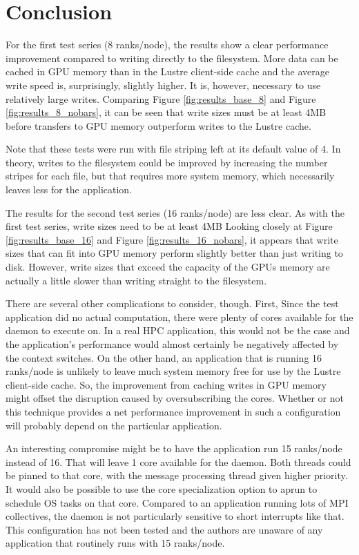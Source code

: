 \section{Conclusion}
\label{sec:conclusion}

For the first test series (8 ranks/node), the results show a clear performance improvement compared to writing directly to the filesystem.   More data can be cached in GPU memory than in the Lustre client-side cache and the average write speed is, surprisingly, slightly higher.  It is, however, necessary to use relatively large writes.   Comparing Figure \ref{fig:results_base_8} and Figure \ref{fig:results_8_nobars},  it can be seen that write sizes must be at least 4MB before transfers to GPU memory outperform writes to the Lustre cache.

Note that these tests were run with file striping left at its default value of 4.  In theory, writes to the filesystem could be improved by increasing the number stripes for each file, but that requires more system memory, which necessarily leaves less for the application.

The results for the second test series (16 ranks/node) are less clear.  As with the first test series, write sizes need to be at least 4MB Looking closely at Figure \ref{fig:results_base_16} and Figure \ref{fig:results_16_nobars}, it appears that write sizes that can fit into GPU memory perform slightly better than just writing to disk.  However, write sizes that exceed the capacity of the GPUs memory are actually a little slower than writing straight to the filesystem.

There are several other complications to consider, though.
First, Since the test application did no actual computation, there were plenty of cores available for the daemon to execute on.  In a real HPC application, this would not be the case and the application's performance would almost certainly be negatively affected by the context switches.  On the other hand, an application that is running 16 ranks/node is unlikely to leave much system memory free for use by the Lustre client-side cache.  So, the improvement from caching writes in GPU memory might offset the disruption caused by oversubscribing the cores.  Whether or not this technique provides a net performance improvement in such a configuration will probably depend on the particular application.

An interesting compromise might be to have the application run 15 ranks/node instead of 16.  That will leave 1 core available for the daemon.  Both threads could be pinned to that core, with the message processing thread given higher priority.  It would also be possible to use the  core specialization option to aprun to schedule OS tasks on that core.  Compared to an application running lots of MPI collectives, the daemon is not particularly sensitive to short interrupts like that.  This configuration has not been tested and the authors are unaware of any application that routinely runs with 15 ranks/node.

